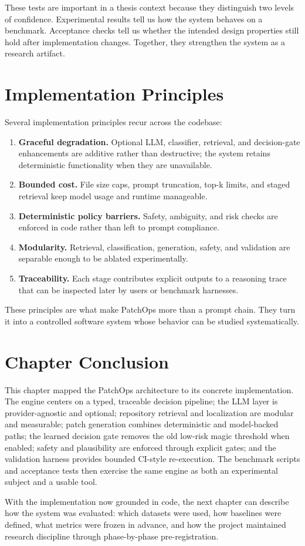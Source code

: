 These tests are important in a thesis context because they distinguish two levels of confidence. Experimental
results tell us how the system behaves on a benchmark. Acceptance checks tell us whether the intended design
properties still hold after implementation changes. Together, they strengthen the system as a research artifact.

\section{Implementation Principles}

Several implementation principles recur across the codebase:

\begin{enumerate}
\item \textbf{Graceful degradation.} Optional LLM, classifier, retrieval, and decision-gate enhancements are
additive rather than destructive; the system retains deterministic functionality when they are unavailable.
\item \textbf{Bounded cost.} File size caps, prompt truncation, top-k limits, and staged retrieval keep model
usage and runtime manageable.
\item \textbf{Deterministic policy barriers.} Safety, ambiguity, and risk checks are enforced in code rather
than left to prompt compliance.
\item \textbf{Modularity.} Retrieval, classification, generation, safety, and validation are separable enough to
be ablated experimentally.
\item \textbf{Traceability.} Each stage contributes explicit outputs to a reasoning trace that can be inspected
later by users or benchmark harnesses.
\end{enumerate}

These principles are what make PatchOps more than a prompt chain. They turn it into a controlled software
system whose behavior can be studied systematically.

\section{Chapter Conclusion}

This chapter mapped the PatchOps architecture to its concrete implementation. The engine centers on a typed,
traceable decision pipeline; the LLM layer is provider-agnostic and optional; repository retrieval and
localization are modular and measurable; patch generation combines deterministic and model-backed paths; the
learned decision gate removes the old low-risk magic threshold when enabled; safety and plausibility are
enforced through explicit gates; and the validation harness provides bounded CI-style re-execution. The
benchmark scripts and acceptance tests then exercise the same engine as both an experimental subject and a
usable tool.

With the implementation now grounded in code, the next chapter can describe how the system was evaluated:
which datasets were used, how baselines were defined, what metrics were frozen in advance, and how the project
maintained research discipline through phase-by-phase pre-registration.

